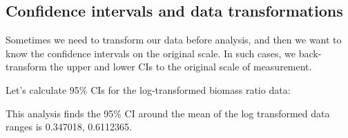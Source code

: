 \documentclass[]{book}
\newenvironment{Shaded}{\begin{snugshade}}{\end{snugshade}}
\newcommand{\CommentTok}[1]{\textcolor[rgb]{0.56,0.35,0.01}{\textit{#1}}}
\newcommand{\DataTypeTok}[1]{\textcolor[rgb]{0.13,0.29,0.53}{#1}}
\newcommand{\DecValTok}[1]{\textcolor[rgb]{0.00,0.00,0.81}{#1}}
\newcommand{\FloatTok}[1]{\textcolor[rgb]{0.00,0.00,0.81}{#1}}
\newcommand{\KeywordTok}[1]{\textcolor[rgb]{0.13,0.29,0.53}{\textbf{#1}}}
\newcommand{\NormalTok}[1]{#1}
\newcommand{\OperatorTok}[1]{\textcolor[rgb]{0.81,0.36,0.00}{\textbf{#1}}}
\newcommand{\StringTok}[1]{\textcolor[rgb]{0.31,0.60,0.02}{#1}}
\theoremstyle{definition}
\theoremstyle{definition}
\theoremstyle{definition}
\theoremstyle{remark}
\begin{document}
\hypertarget{confidence-intervals-and-data-transformations}{%
\subsection{Confidence intervals and data
transformations}\label{confidence-intervals-and-data-transformations}}

Sometimes we need to transform our data before analysis, and then we
want to know the confidence intervals on the original scale. In such
cases, we back-transform the upper and lower CIs to the original scale
of measurement.

Let's calculate 95\% CIs for the log-transformed biomass ratio data:

\begin{Shaded}
\end{Shaded}

This analysis finds the 95\% CI around the mean of the log transformed
data ranges is 0.347018, 0.6112365.
\end{document}
